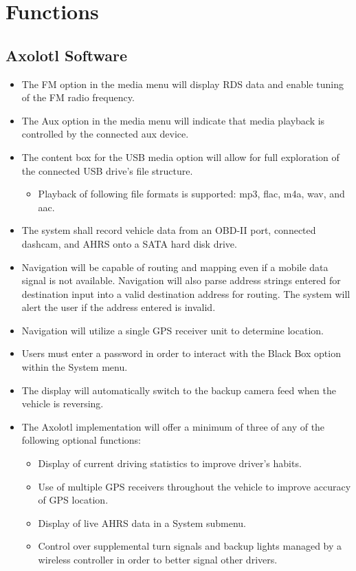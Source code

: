 \documentclass[onecolumn, draftclsnofoot,10pt, compsoc]{IEEEtran}
\begin{document}
\section{Functions}
\subsection{Axolotl Software}
\begin{itemize}
\item The FM option in the media menu will display RDS data and enable tuning of the FM radio frequency.
\item The Aux option in the media menu will indicate that media playback is controlled by the connected aux device.
\item The content box for the USB media option will allow for full exploration of the connected USB drive’s file structure.
\begin{itemize}
\item Playback of following file formats is supported: mp3, flac, m4a, wav, and aac.
\end{itemize}
\item The system shall record vehicle data from an OBD-II port, connected dashcam, and AHRS onto a SATA hard disk drive.
\item Navigation will be capable of routing and mapping even if a mobile data signal is not available. Navigation will also parse address strings entered for destination input into a valid destination address for routing. The system will alert the user if the address entered is invalid.
\item Navigation will utilize a single GPS receiver unit to determine location.
\item Users must enter a password in order to interact with the Black Box option within the System menu.
\item The display will automatically switch to the backup camera feed when the vehicle is reversing. 
\item The Axolotl implementation will offer a minimum of three of any of the following optional functions:
\begin{itemize}
\item Display of current driving statistics to improve driver’s habits.
\item Use of multiple GPS receivers throughout the vehicle to improve accuracy of GPS location.
\item Display of live AHRS data in a System submenu.
\item Control over supplemental turn signals and backup lights managed by a wireless controller in order to better signal other drivers.

\end{itemize}
\end{itemize}
\end{document}
